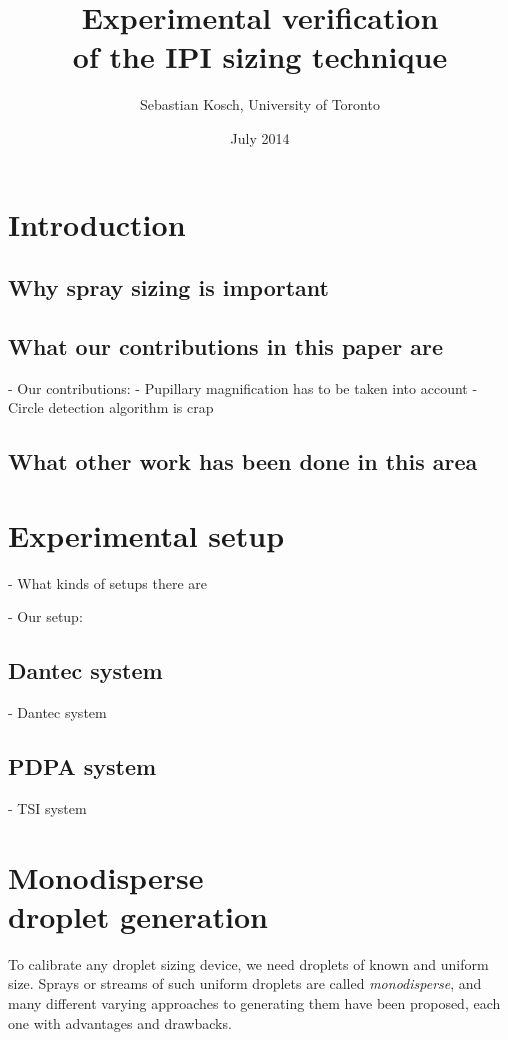 \documentclass[11.5pt]{book}
\begin{document}
\title{Experimental verification\\ of the IPI sizing technique}
\author{Sebastian Kosch, University of Toronto}
\date{July 2014}
\maketitle

\printnomenclature[5em]

\chapter{Introduction}
\section{Why spray sizing is important}
\section{What our contributions in this paper are}
- Our contributions:
    - Pupillary magnification has to be taken into account
    - Circle detection algorithm is crap
\section{What other work has been done in this area}

\chapter{Experimental setup}
- What kinds of setups there are

- Our setup:
\section{Dantec system}
    - Dantec system
\section{PDPA system}
    - TSI system

    \chapter[Monodisperse droplet generation]{Monodisperse\\droplet generation}
\label{sec:droplet-generator}

To calibrate any droplet sizing device, we need droplets of known and uniform
size. Sprays or streams of such uniform droplets are called \emph{monodisperse},
and many different varying approaches to generating them have been proposed,
each one with advantages and drawbacks.
\end{document}
